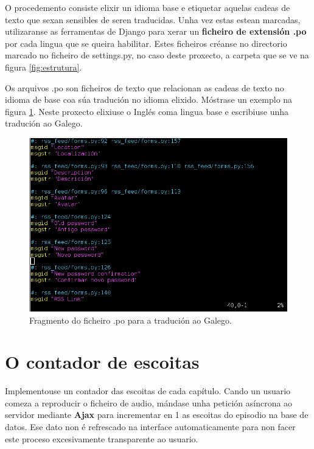O procedemento consiste elixir un idioma base e etiquetar aquelas cadeas de texto que sexan sensibles de seren traducidas. Unha vez estas estean marcadas, utilizaranse as ferramentas de Django para xerar un \textbf{ficheiro de extensión .po} por cada lingua que se queira habilitar. Estes ficheiros créanse no directorio marcado no ficheiro de settings.py, no caso deste proxecto, a carpeta  que se ve na figura \ref{fig:estrutura}.

Os arquivos .po son ficheiros de texto que relacionan as cadeas de texto no idioma de base coa súa tradución no idioma elixido. Móstrase un exemplo na figura \ref{fig:traducion}. Neste proxecto elixiuse o Inglés coma lingua base e escribiuse unha tradución ao Galego.

\begin{figure}[h]
	\centering
	\includegraphics[scale=0.5,keepaspectratio=true]{./images/traducion.png}
	\caption{Fragmento do ficheiro .po para a tradución ao Galego.}
	\label{fig:traducion}
\end{figure} 


\section{O contador de escoitas}

Implementouse un contador das escoitas de cada capítulo. Cando un usuario comeza a reproducir o ficheiro de audio, mándase unha petición asíncrona ao servidor mediante \textbf{Ajax} para incrementar en 1 as escoitas do episodio na base de datos. Ese dato non é refrescado na interface automaticamente para non facer este proceso excesivamente transparente ao usuario.

